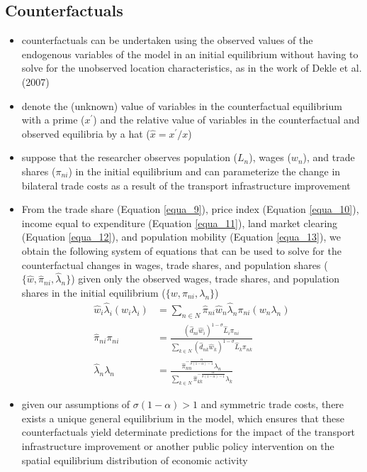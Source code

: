 \documentclass[11pt]{article}
\begin{document}
\subsection*{Counterfactuals}
\begin{itemize}
\item counterfactuals can be undertaken using the observed values of the endogenous variables of the model in an initial equilibrium without having to solve for the unobserved location characteristics, as in the work of Dekle et al. (2007)
\item denote the (unknown) value of variables in the counterfactual equilibrium with a prime ($x^{'}$) and the relative value of variables in the counterfactual and observed equilibria by a hat ($\hat{x} = x^{'}/x$)
\item suppose that the researcher observes population ($L_{n}$), wages ($w_{n}$), and trade shares ($\pi_{ni}$) in the initial equilibrium and can parameterize the change in bilateral trade costs as a result of the transport infrastructure improvement
\item From the trade share (Equation \ref{equa_9}), price index (Equation \ref{equa_10}), income equal to expenditure (Equation \ref{equa_11}), land market clearing (Equation \ref{equa_12}), and population mobility (Equation \ref{equa_13}), we obtain the following system of equations that can be used to solve for the counterfactual changes in wages, trade shares, and population shares  ($\lbrace \hat{w}, \hat{\pi}_{ni}, \hat{\lambda}_{n} \rbrace$) given only the observed wages, trade shares, and population shares in the initial equilibrium ($\lbrace w, \pi_{ni}, \lambda_{n} \rbrace$)
\begin{align}
\hat{w}_{i} \hat{\lambda}_{i} (w_{i} \lambda_{i}) & = \sum_{n \in N} \hat{\pi}_{ni} \hat{w}_{n} \hat{\lambda}_{n} \pi_{ni} (w_{n} \lambda_{n}) \\
\hat{\pi}_{ni} \pi_{ni} & = \frac{(\hat{d}_{ni} \hat{w}_{i})^{1 - \sigma} \hat{L}_{i} \pi_{ni}}{\sum_{k \in N} (\hat{d}_{nk} \hat{w}_{k})^{1 - \sigma} \hat{L}_{k} \pi_{nk}} \\
\hat{\lambda}_{n} \lambda_{n} & = \frac{\hat{\pi}_{nn}^{- \frac{\alpha}{\sigma (1 - \alpha ) - 1}} \lambda_{n}}{\sum_{k \in N} \hat{\pi}_{kk}^{- \frac{\alpha}{\sigma (1 - \alpha ) - 1}} \lambda_{k}}
\end{align}
\item given our assumptions of $\sigma (1 - \alpha ) >1$ and symmetric trade costs, there exists a unique general equilibrium in the model, which ensures that these counterfactuals yield determinate predictions for the impact of the transport infrastructure improvement or another public policy intervention on the spatial equilibrium distribution of economic activity
\end{itemize}
\end{document}
